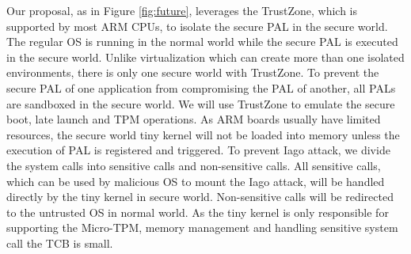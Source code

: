 Our proposal, as in Figure \ref{fig:future}, leverages the TrustZone, which is
supported by most ARM CPUs, to isolate the secure PAL in the secure world. The
regular OS is running in the normal world while the secure PAL is executed in
the secure world. Unlike virtualization which can create more than one isolated
environments, there is only one secure world with TrustZone. To prevent the
secure PAL of one application from compromising the PAL of another, all PALs
are sandboxed in the secure world. We will use TrustZone to emulate the secure
boot, late launch and TPM operations. As ARM boards usually have limited
resources, the secure world tiny kernel will not be loaded into memory unless
the execution of PAL is registered and triggered. To prevent Iago attack, we
divide the system calls into sensitive calls and non-sensitive calls. All
sensitive calls, which can be used by malicious OS to mount the Iago attack,
will be handled directly by the tiny kernel in secure world. Non-sensitive
calls will be redirected to the untrusted OS in normal world. As the tiny
kernel is only responsible for supporting the Micro-TPM, memory management and
handling sensitive system call the TCB is small.
